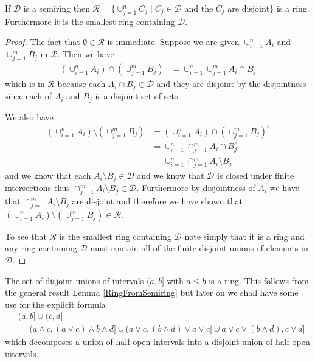 \begin{lem}\label{RingFromSemiring}If $\mathcal{D}$ is a semiring then $\mathcal{R} = \lbrace
  \cup_{j=1}^n C_j \mid C_j \in \mathcal{D} \text{ and the $C_j$ are
    disjoint} \rbrace$ is a ring.  Furthermore it is the smallest ring
  containing $\mathcal{D}$.
\end{lem}
\begin{proof}
The fact that $\emptyset \in \mathcal{R}$ is immediate.  Suppose we
are given $\cup_{i=1}^n A_i$ and $\cup_{j=1}^m B_j$ in
$\mathcal{R}$. Then we have
\begin{align}
\left ( \cup_{i=1}^n A_i \right ) \cap \left ( \cup_{j=1}^m B_j \right
) &= \cup_{i=1}^n \cup_{j=1}^m A_i \cap B_j
\end{align}
which is in $\mathcal{R}$ because each $A_i \cap B_j \in \mathcal{D}$
and they are disjoint by the disjointness since each of $A_i$ and
$B_j$ is a disjoint set of sets.  

We also have 
\begin{align}
\left ( \cup_{i=1}^n A_i \right ) \setminus \left ( \cup_{j=1}^m B_j \right
) &=\left ( \cup_{i=1}^n A_i \right ) \cap \left ( \cup_{j=1}^m B_j \right
)^c \\
&=\cup_{i=1}^n \cap_{j=1}^m A_i \cap B_j^c \\
&=\cup_{i=1}^n \cap_{j=1}^m A_i \setminus B_j
\end{align}
and we know that each $A_i \setminus B_j \in \mathcal{D}$ and we know
that $\mathcal{D}$ is closed under finite intersections thus
$\cap_{j=1}^m A_i \setminus B_j \in \mathcal{D}$.  Furthermore by
disjointness of $A_i$ we have that $\cap_{j=1}^m A_i \setminus B_j$
are disjoint and therefore we have shown that $\left ( \cup_{i=1}^n A_i \right ) \setminus \left ( \cup_{j=1}^m B_j \right
) \in \mathcal{R}$.

To see that $\mathcal{R}$ is the smallest ring containing
$\mathcal{D}$ note simply that it is a ring and any ring containing
$\mathcal{D}$ must contain all of the finite disjoint unions of
elements in $\mathcal{D}$.
\end{proof}

\begin{examp}\label{RingOfDisjointUnionHalfOpenIntervals}The set of disjoint unions of intervals $(a,b]$ with $a \leq b$ is a
  ring.  This follows from the general result Lemma
  \ref{RingFromSemiring} but later on we shall have some use for the
  explicit formula
\begin{align*}
&(a,b] \cup (c,d] \\
&= (a \wedge c, (a \vee c) \wedge b \wedge d] \cup (a \vee c, (b
\wedge d) \vee a \vee c]
\cup a \vee c \vee (b \wedge d), c \vee d]
\end{align*}
which decomposes a union of half open intervals into a disjoint union
of half open intervals.
\end{examp}
 
